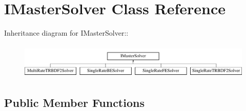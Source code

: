 \hypertarget{classIMasterSolver}{
\section{IMasterSolver Class Reference}
\label{classIMasterSolver}
}
Inheritance diagram for IMasterSolver::\begin{figure}[H]
\begin{center}
\leavevmode
\includegraphics[height=1.70732cm]{classIMasterSolver}
\end{center}
\end{figure}
\subsection*{Public Member Functions}
